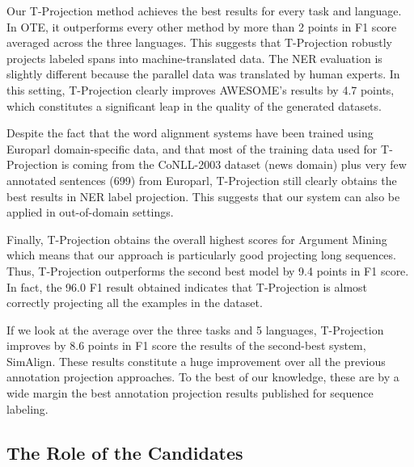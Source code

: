 \documentclass[11pt]{article}
\begin{document}
Our T-Projection method achieves the best results for every task and language.
In OTE, it outperforms every other method by more than 2 points in F1 score
averaged across the three languages. This suggests that T-Projection robustly
projects labeled spans into machine-translated data. The NER evaluation is
slightly different because the parallel data was translated by human experts.
In this setting, T-Projection clearly improves AWESOME's results by 4.7 points,
which constitutes a significant leap in the quality of the generated datasets. 

Despite the fact that the word
alignment systems have been trained using Europarl domain-specific data, and that
most of the training data used for T-Projection is coming from the CoNLL-2003
dataset (news domain) plus very few annotated sentences (699) from Europarl,
T-Projection still clearly obtains the best results in NER label projection. This
suggests that our system can also be applied in out-of-domain settings. 

Finally, T-Projection obtains the overall highest scores for Argument Mining
which means that our approach is particularly good projecting long sequences.
Thus, T-Projection outperforms the second best model by
9.4 points in F1 score. In fact, the 96.0 F1 result obtained indicates that
T-Projection is almost correctly projecting all the examples in the dataset.

If we look at the average over the three tasks and 5 languages, T-Projection improves
by 8.6 points in F1 score the results of the second-best system, SimAlign.
These results constitute a huge improvement over all the previous annotation projection
approaches. To the best of our knowledge, these are by a wide margin the best
annotation projection results published for sequence labeling.

\subsection{The Role of the Candidates}
\end{document}
